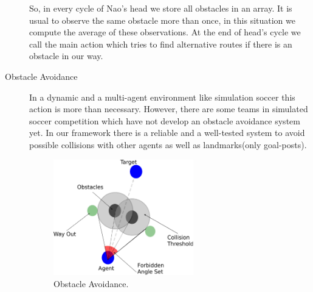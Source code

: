 \begin{description}
So, in every cycle of Nao's head we store all obstacles in an array. It is usual to observe the same obstacle more than once, in this situation we compute the average of these observations. At the end of head's cycle we call the main action which tries to find alternative routes if there is an obstacle in our way.
 \item[Obstacle Avoidance]
 In a dynamic and a multi-agent environment like simulation soccer this action is more than necessary. However, there are some teams in simulated soccer competition which have not develop an obstacle avoidance system yet. In our framework there is a
 reliable and a well-tested system to avoid possible collisions with other agents as well as landmarks(only goal-posts).
  \begin{figure}[!h]
\centering
  \includegraphics[width=0.6\textwidth]{Chapter3/figures/ObstacleAvoidance.pdf}
  \caption{Obstacle Avoidance.}
  \label{fig:ObstacleAvoidance}
\end{figure} 
\end{description}

